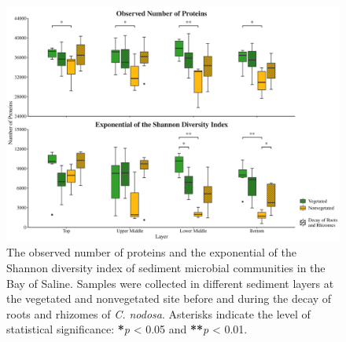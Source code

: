 \documentclass[
  12 pt,
]{article}
\begin{document}
\begin{figure}[H]

{\centering \includegraphics[width=1\linewidth]{../results/figures/alpha} 

}

\caption{The observed number of proteins and the exponential of the Shannon diversity index of sediment microbial communities in the Bay of Saline. Samples were collected in different sediment layers at the vegetated and nonvegetated site before and during the decay of roots and rhizomes of \emph{C. nodosa}. Asterisks indicate the level of statistical significance: \textbf{*}\emph{p} \textless{} 0.05 and \textbf{**}\emph{p} \textless{} 0.01.}\label{fig:alpha}
\end{figure}
\end{document}
